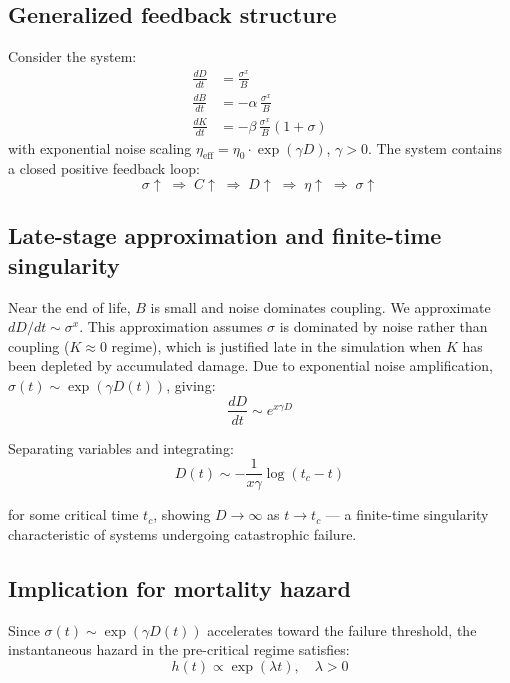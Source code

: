 \documentclass[12pt]{article}
\begin{document}
\subsection{Generalized feedback structure}

Consider the system:
\begin{align}
\frac{dD}{dt} &= \frac{\sigma^x}{B} \\
\frac{dB}{dt} &= -\alpha\,\frac{\sigma^x}{B} \\
\frac{dK}{dt} &= -\beta\,\frac{\sigma^x}{B}(1 + \sigma)
\end{align}
with exponential noise scaling $\eta_\text{eff} = \eta_0 \cdot \exp(\gamma D)$,
$\gamma > 0$. The system contains a closed positive feedback loop:
\begin{equation}
\sigma \uparrow \;\Rightarrow\; C \uparrow \;\Rightarrow\; D \uparrow
\;\Rightarrow\; \eta \uparrow \;\Rightarrow\; \sigma \uparrow
\end{equation}

\subsection{Late-stage approximation and finite-time singularity}

Near the end of life, $B$ is small and noise dominates coupling. We approximate
$dD/dt \sim \sigma^x$. This approximation assumes $\sigma$ is dominated by noise
rather than coupling ($K \approx 0$ regime), which is justified late in the
simulation when $K$ has been depleted by accumulated damage. Due to exponential noise amplification,
$\sigma(t) \sim \exp(\gamma D(t))$, giving:
\begin{equation}
\frac{dD}{dt} \sim e^{x\gamma D}
\end{equation}

Separating variables and integrating:
\begin{equation}
D(t) \sim -\frac{1}{x\gamma}\log(t_c - t)
\end{equation}

for some critical time $t_c$, showing $D \to \infty$ as $t \to t_c$ — a
finite-time singularity characteristic of systems undergoing catastrophic failure.

\subsection{Implication for mortality hazard}

Since $\sigma(t) \sim \exp(\gamma D(t))$ accelerates toward the failure
threshold, the instantaneous hazard in the pre-critical regime satisfies:
\begin{equation}
h(t) \propto \exp(\lambda t), \quad \lambda > 0
\end{equation}
\end{document}
